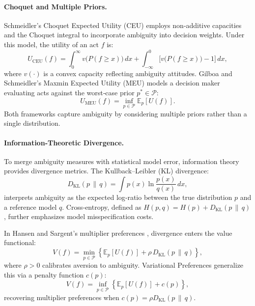 \documentclass[preprint,12pt,authoryear]{elsarticle}
\begin{document}
\paragraph{Choquet and Multiple Priors.} Schmeidler’s Choquet Expected Utility (CEU) \cite{schmeidler1989} employs non‑additive capacities and the Choquet integral to incorporate ambiguity into decision weights. Under this model, the utility of an act $f$ is:
\begin{equation}
U_{\mathrm{CEU}}(f)=\int_0^\infty v\bigl(P(f\ge x)\bigr)\,dx + \int_{-\infty}^0 \bigl[v\bigl(P(f\ge x)\bigr)-1\bigr]\,dx,
\end{equation}
where $v(\cdot)$ is a convex capacity reflecting ambiguity attitudes. Gilboa and Schmeidler’s Maxmin Expected Utility (MEU) \cite{gilboa1989} models a decision maker evaluating acts against the worst‑case prior $p^*\in\mathcal{P}$:
\begin{equation}
U_{\mathrm{MEU}}(f)=\inf_{p\in\mathcal{P}}\mathbb{E}_p[U(f)].
\end{equation}
Both frameworks capture ambiguity by considering multiple priors rather than a single distribution.

\paragraph{Information‑Theoretic Divergence.} To merge ambiguity measures with statistical model error, information theory provides divergence metrics. The Kullback–Leibler (KL) divergence:
\begin{equation}
D_{\mathrm{KL}}(p\,\|\,q)=\int p(x)\ln\frac{p(x)}{q(x)}\,dx,
\end{equation}
interprets ambiguity as the expected log‑ratio between the true distribution $p$ and a reference model $q$. Cross‑entropy, defined as $H(p,q)=H(p)+D_{\mathrm{KL}}(p\,\|\,q)$, further emphasizes model misspecification costs.

In Hansen and Sargent’s multiplier preferences \cite{hansen2001}, divergence enters the value functional:
\begin{equation}
V(f)=\min_{p\in\mathcal{P}}\left\{\mathbb{E}_p[U(f)] + \rho\,D_{\mathrm{KL}}(p\,\|\,q)\right\},
\end{equation}
where $\rho>0$ calibrates aversion to ambiguity. Variational Preferences \cite{maccheroni2006} generalize this via a penalty function $c(p)$:
\begin{equation}
V(f)=\inf_{p\in\mathcal{P}}\left\{\mathbb{E}_p[U(f)] + c(p)\right\},
\end{equation}
recovering multiplier preferences when $c(p)=\rho D_{\mathrm{KL}}(p\,\|\,q)$.
\end{document}
